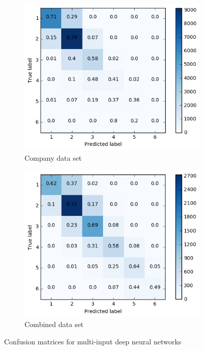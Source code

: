\begin{figure}[h]
\begin{subfigure}{.4\textwidth}
  \includegraphics[width=.95\linewidth]{img/corp_d2_cm_favorites}
  \caption{Company data set}
  \label{fig:d2_fav_distr_sub3}
\end{subfigure}%
\begin{subfigure}{.4\textwidth}
  \includegraphics[width=.95\linewidth]{img/comb_d2_cm_favorites}
  \caption{Combined data set}
  \label{fig:d2_fav_distr_sub4}
\end{subfigure}%
\caption{Confusion matrices for multi-input deep neural networks}
\label{fig:d2_fav_cm}
\end{figure}
